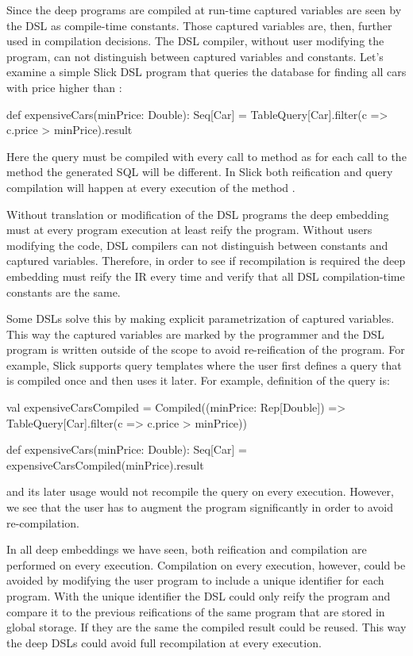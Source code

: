 Since the deep programs are compiled at run-time captured variables are seen by the DSL
  as compile-time constants. Those captured variables are, then, further used in compilation
  decisions. The DSL compiler, without user modifying the program, can not distinguish between
  captured variables and constants.  Let's examine a simple Slick DSL program that queries the database
  for finding all cars with price higher than :\begin{lstparagraph}
def expensiveCars(minPrice: Double): Seq[Car] =
  TableQuery[Car].filter(c => c.price > minPrice).result
\end{lstparagraph}
Here the query must be compiled with every call to  method as for
each call to the method the generated SQL will be different. In Slick both reification
and query compilation will happen at every execution of the method .


Without translation or modification of the DSL programs the deep embedding must
 at every program execution at least reify the program.
 Without users modifying the code, DSL compilers can not distinguish between
 constants and captured variables. Therefore, in order to see if recompilation is required
 the deep embedding must reify the IR every time and verify that all DSL compilation-time
 constants are the same.

Some DSLs solve this by making explicit parametrization of captured variables. This way the captured
 variables are marked by the programmer and the DSL program is written outside of the scope to avoid
 re-reification of the program. For example, Slick supports query templates where the user first
 defines a query that is compiled once and then uses it later. For example, definition of the  query is:\begin{lstparagraph}
val expensiveCarsCompiled = Compiled((minPrice: Rep[Double]) =>
  TableQuery[Car].filter(c => c.price > minPrice))

def expensiveCars(minPrice: Double): Seq[Car] =
  expensiveCarsCompiled(minPrice).result
 \end{lstparagraph}
 and its later usage would not recompile the query on every execution. However, we see that
 the user has to augment the program significantly in order to avoid re-compilation.

In all deep embeddings we have seen, both reification and compilation are performed on every
 execution. Compilation on every execution, however, could be avoided by modifying the user program to include
 a unique identifier for each program. With the unique identifier the DSL could only reify
 the program and compare it to the previous reifications of the same program that are stored
 in global storage. If they are the same the compiled result could be reused. This way the deep DSLs could avoid full recompilation
 at every execution.

